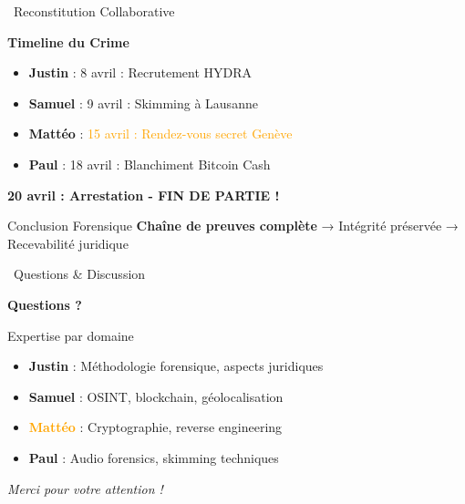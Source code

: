 \documentclass{beamer}
\begin{document}

\begin{frame}{\faCalendar \, Reconstitution Collaborative}
\begin{center}
\textbf{\Large{Timeline du Crime}}
\end{center}

\begin{itemize}
    \item[\faUser] \textbf{Justin} : \textcolor{hydroblue}{8 avril : Recrutement HYDRA}
    \item[\faVolumeUp] \textbf{Samuel} : \textcolor{forensicgreen}{9 avril : Skimming à Lausanne}  
    \item[\faMapMarker] \textbf{Mattéo} : \textcolor{orange}{15 avril : Rendez-vous secret Genève}
    \item[\faBitcoin] \textbf{Paul} : \textcolor{crimsonred}{18 avril : Blanchiment Bitcoin Cash}
\end{itemize}

\pause
\begin{center}
\Large{\textcolor{crimsonred}{\textbf{20 avril : Arrestation - FIN DE PARTIE !}}}
\end{center}

\pause
\begin{block}{Conclusion Forensique}
\textbf{Chaîne de preuves complète} → Intégrité préservée → \textcolor{forensicgreen}{Recevabilité juridique}
\end{block}
\end{frame}

\begin{frame}{\faQuestion \, Questions \& Discussion}
\begin{center}
\Large{\textbf{Questions ?}}
\end{center}

\begin{block}{Expertise par domaine}
\begin{itemize}
    \item \textcolor{hydroblue}{\textbf{Justin}} : Méthodologie forensique, aspects juridiques
    \item \textcolor{forensicgreen}{\textbf{Samuel}} : OSINT, blockchain, géolocalisation  
    \item \textcolor{orange}{\textbf{Mattéo}} : Cryptographie, reverse engineering
    \item \textcolor{crimsonred}{\textbf{Paul}} : Audio forensics, skimming techniques
\end{itemize}
\end{block}

\vfill
\begin{center}
\textit{Merci pour votre attention !}
\end{center}
\end{frame}
\end{document}
